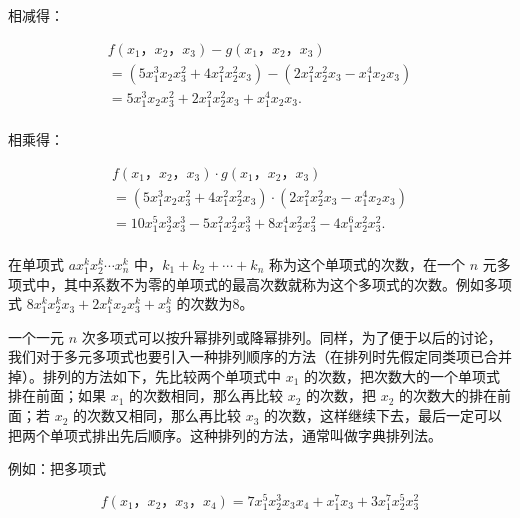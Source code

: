 相减得：

\[
\begin{array}{l} f \left(x _ {1}\text{，} x _ {2}\text{，} x _ {3}\right) - g \left(x _ {1}\text{，} x _ {2}\text{，} x _ {3}\right) \\ = \left(5 x _ {1} ^ {3} x _ {2} x _ {3} ^ {2} + 4 x _ {1} ^ {2} x _ {2} ^ {2} x _ {3}\right) - \left(2 x _ {1} ^ {2} x _ {2} ^ {2} x _ {3} - x _ {1} ^ {4} x _ {2} x _ {3}\right) \\ = 5 x _ {1} ^ {3} x _ {2} x _ {3} ^ {2} + 2 x _ {1} ^ {2} x _ {2} ^ {2} x _ {3} + x _ {1} ^ {4} x _ {2} x _ {3}. \\ \end{array}
\]

相乘得：

\[
\begin{array}{l} f \left(x _ {1}\text{，} x _ {2}\text{，} x _ {3}\right) \cdot g \left(x _ {1}\text{，} x _ {2}\text{，} x _ {3}\right) \\ = \left(5 x _ {1} ^ {3} x _ {2} x _ {3} ^ {2} + 4 x _ {1} ^ {2} x _ {2} ^ {2} x _ {3}\right) \cdot \left(2 x _ {1} ^ {2} x _ {2} ^ {2} x _ {3} - x _ {1} ^ {4} x _ {2} x _ {3}\right) \\ = 10 x _ {1} ^ {5} x _ {2} ^ {3} x _ {3} ^ {3} - 5 x _ {1} ^ {2} x _ {2} ^ {2} x _ {3} ^ {3} + 8 x _ {1} ^ {4} x _ {2} ^ {2} x _ {3} ^ {2} - 4 x _ {1} ^ {6} x _ {2} ^ {2} x _ {3} ^ {2}. \\ \end{array}
\]

在单项式 \(ax_1^k x_2^k \cdots x_n^k\) 中，\(k_1 + k_2 + \cdots + k_n\)
称为这个单项式的次数，在一个 \(n\)
元多项式中，其中系数不为零的单项式的最高次数就称为这个多项式的次数。例如多项式
\(8x_1^k x_2^k x_3 + 2x_1^k x_2x_3^k + x_3^k\) 的次数为8。

一个一元 \(n\)
次多项式可以按升幂排列或降幂排列。同样，为了便于以后的讨论，我们对于多元多项式也要引入一种排列顺序的方法（在排列时先假定同类项已合并掉）。排列的方法如下，先比较两个单项式中
\(x_{1}\) 的次数，把次数大的一个单项式排在前面；如果 \(x_{1}\)
的次数相同，那么再比较 \(x_{2}\) 的次数，把 \(x_{2}\)
的次数大的排在前面；若 \(x_{2}\) 的次数又相同，那么再比较 \(x_{3}\)
的次数，这样继续下去，最后一定可以把两个单项式排出先后顺序。这种排列的方法，通常叫做字典排列法。

例如：把多项式

\[
f \left(x _ {1}\text{，} x _ {2}\text{，} x _ {3}\text{，} x _ {4}\right) = 7 x _ {1} ^ {5} x _ {2} ^ {3} x _ {3} x _ {4} + x _ {1} ^ {7} x _ {3} + 3 x _ {1} ^ {7} x _ {2} ^ {5} x _ {3} ^ {2}
\]

